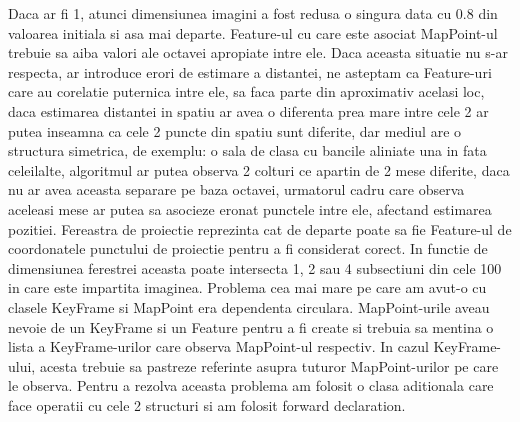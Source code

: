 \documentclass[12pt,a4paper]{report}
\begin{document}
Daca ar fi 1, atunci dimensiunea imagini a fost redusa o singura data cu 0.8 din valoarea initiala 
si asa mai departe. Feature-ul cu care este asociat MapPoint-ul trebuie sa aiba valori ale octavei
apropiate intre ele. Daca aceasta situatie nu s-ar respecta, ar introduce erori de estimare 
a distantei, ne asteptam ca Feature-uri care au corelatie puternica intre ele, sa faca parte 
din aproximativ acelasi loc, daca estimarea distantei in spatiu ar avea o diferenta prea mare intre 
cele 2 ar putea inseamna ca cele 2 puncte din spatiu sunt diferite, dar mediul are o structura 
simetrica, de exemplu: o sala de clasa cu bancile aliniate una in fata celeilalte, algoritmul 
ar putea observa 2 colturi ce apartin de 2 mese diferite, daca nu ar avea aceasta separare 
pe baza octavei, urmatorul cadru care observa aceleasi mese ar putea sa asocieze eronat punctele 
intre ele, afectand estimarea pozitiei. Fereastra de proiectie reprezinta cat de departe poate 
sa fie Feature-ul de coordonatele punctului de proiectie pentru a fi considerat corect. In functie 
de dimensiunea ferestrei aceasta poate intersecta 1, 2 sau 4 subsectiuni din cele 100 in care 
este impartita imaginea. Problema cea mai mare pe care am avut-o cu clasele KeyFrame si MapPoint
era dependenta circulara. MapPoint-urile aveau nevoie de un KeyFrame si un Feature pentru a fi 
create si trebuia sa mentina o lista a KeyFrame-urilor care observa MapPoint-ul respectiv.
In cazul KeyFrame-ului, acesta trebuie sa pastreze referinte asupra tuturor MapPoint-urilor pe 
care le observa. Pentru a rezolva aceasta problema am folosit o clasa aditionala care face 
operatii cu cele 2 structuri si am folosit forward declaration.  \\  
\end{document}
